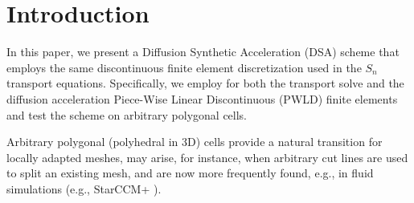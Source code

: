\documentclass[preprint,10pt]{elsarticle}
\renewcommand{\(}{\left(}
\renewcommand{\)}{\right)}
\renewcommand{\[}{\left[}
\renewcommand{\]}{\right]}
\newcommand{\sn}{\ensuremath{S_n}\xspace}
\begin{document}
\linenumbers
\doublespacing


\section{Introduction}

In this paper, we present a Diffusion Synthetic Acceleration (DSA) scheme that employs the 
same discontinuous finite element discretization used in the \sn transport equations. 
Specifically, we employ for both the transport solve and the diffusion acceleration 
Piece-Wise Linear Discontinuous (PWLD) finite elements and test the scheme on  arbitrary
polygonal cells. 

Arbitrary polygonal (polyhedral in 3D) cells provide a natural transition for locally 
adapted meshes, may arise, for instance, when arbitrary cut lines are used to split an existing mesh,
and are now more frequently found, e.g., in fluid simulations (e.g., StarCCM+ \cite{starccm}).

 
\end{document}
